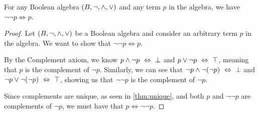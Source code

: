 \begin{theorem}
    For any Boolean algebra $(B, \neg, \wedge, \vee)$ and any term $p$ in the algebra,
    we have $\neg \neg p \iff p$.
\end{theorem}
\begin{proof}
    Let $(B, \neg, \wedge, \vee)$ be a Boolean algebra
    and consider an arbitrary term $p$ in the algebra.
    We want to show that $\neg \neg p \iff p$.

    By the Complement axiom, we know $p \wedge \neg p ~\Leftrightarrow~ \bot$ and $p \vee \neg p ~\Leftrightarrow~ \top$,
    meaning that $p$ is the complement of $\neg p$.
    Similarly, we can see that $\neg p \wedge \neg (\neg p) ~\Leftrightarrow~ \bot$ and $\neg p \vee \neg (\neg p) ~\Leftrightarrow~ \top$,
    showing us that $\neg \neg p$ is the complement of $\neg p$.

    Since complements are unique, as seen in \autoref{thm:unique},
    and both $p$ and $\neg \neg p$ are complements of $\neg p$, we must have that $p \iff \neg \neg p$.
\end{proof}

